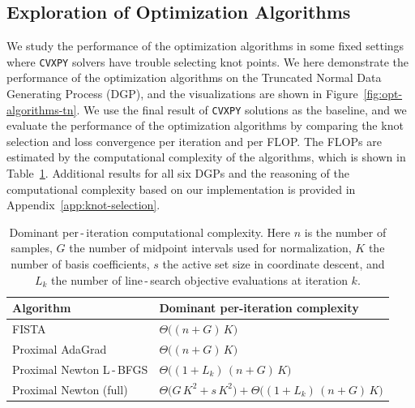 \subsection{Exploration of Optimization Algorithms} \label{subsct: exploration_of_optimization_algorithms}
We study the performance of the optimization algorithms in some fixed settings where \texttt{CVXPY} solvers have trouble selecting knot points. We here demonstrate the performance of the optimization algorithms on the Truncated Normal Data Generating Process (DGP), and the visualizations are shown in Figure~\ref{fig:opt-algorithms-tn}. We use the final result of \texttt{CVXPY} solutions as the baseline, and we evaluate the performance of the optimization algorithms by comparing the knot selection and loss convergence per iteration and per FLOP. The FLOPs are estimated by the computational complexity of the algorithms, which is shown in Table~\ref{tab:complexity-summary}. Additional results for all six DGPs and the reasoning of the computational complexity based on our implementation is provided in Appendix~\ref{app:knot-selection}.

\begin{table}[tbp]
   \centering
   \begin{tabular}{ll}
   \toprule
   Algorithm & Dominant per-iteration complexity \\
   \midrule
   FISTA & $\Theta\big((n + G)\,K\big)$ \\
   Proximal AdaGrad & $\Theta\big((n + G)\,K\big)$ \\
   Proximal Newton L\,-\,BFGS & $\Theta\big((1+L_k)\,(n + G)\,K\big)$ \\
   Proximal Newton (full) & $\Theta\big(G\,K^2 + s\,K^2\big) + \Theta\big((1+L_k)\,(n + G)\,K\big)$ \\
   \bottomrule
   \end{tabular}
   \caption{Dominant per\,-\,iteration computational complexity. Here $n$ is the number of samples, $G$ the number of midpoint intervals used for normalization, $K$ the number of basis coefficients, $s$ the active set size in coordinate descent, and $L_k$ the number of line\,-\,search objective evaluations at iteration $k$.}
   \label{tab:complexity-summary}
   \end{table}


